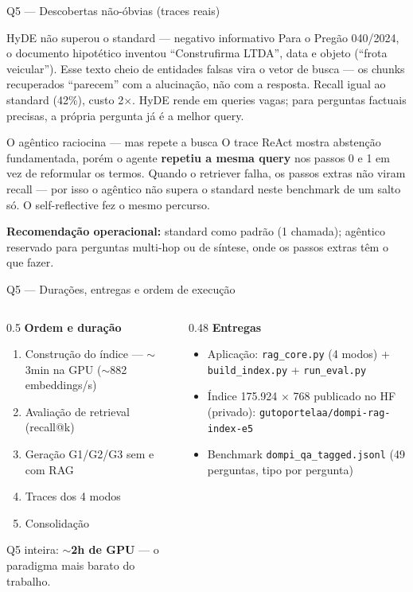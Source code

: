 \documentclass[10pt,aspectratio=169]{beamer}
\begin{document}
\begin{frame}{Q5 — Descobertas não-óbvias (traces reais)}
  \begin{alertblock}{HyDE não superou o standard — negativo informativo}
    \small Para o Pregão 040/2024, o documento hipotético inventou ``Construfirma LTDA'', data e
    objeto (``frota veicular''). Esse texto cheio de entidades falsas vira o vetor de busca — os
    chunks recuperados ``parecem'' com a alucinação, não com a resposta. Recall igual ao standard
    (42\%), custo 2$\times$. HyDE rende em queries vagas; para perguntas factuais precisas,
    a própria pergunta já é a melhor query.
  \end{alertblock}
  \begin{block}{O agêntico raciocina — mas repete a busca}
    \small O trace ReAct mostra abstenção fundamentada, porém o agente \textbf{repetiu a mesma query}
    nos passos 0 e 1 em vez de reformular os termos. Quando o retriever falha, os passos extras não
    viram recall — por isso o agêntico não supera o standard neste benchmark de um salto só.
    O self-reflective fez o mesmo percurso.
  \end{block}
  \small \textbf{Recomendação operacional:} standard como padrão (1 chamada); agêntico reservado
  para perguntas multi-hop ou de síntese, onde os passos extras têm o que fazer.
\end{frame}

\begin{frame}{Q5 — Durações, entregas e ordem de execução}
  \begin{columns}[T]
    \begin{column}{0.5\textwidth}
      \textbf{Ordem e duração}
      \begin{enumerate}\small
        \item Construção do índice — $\sim$3min na GPU ($\sim$882 embeddings/s)
        \item Avaliação de retrieval (recall@k)
        \item Geração G1/G2/G3 sem e com RAG
        \item Traces dos 4 modos
        \item Consolidação
      \end{enumerate}
      \small Q5 inteira: $\sim$\textbf{2h de GPU} — o paradigma mais barato do trabalho.
    \end{column}
    \begin{column}{0.48\textwidth}
      \textbf{Entregas}
      \begin{itemize}\small
        \item Aplicação: \texttt{rag\_core.py} (4 modos) + \texttt{build\_index.py} + \texttt{run\_eval.py}
        \item Índice 175.924 $\times$ 768 publicado no HF (privado): \texttt{gutoportelaa/dompi-rag-index-e5}
        \item Benchmark \texttt{dompi\_qa\_tagged.jsonl} (49 perguntas, tipo por pergunta)
      \end{itemize}
    \end{column}
  \end{columns}
\end{frame}
\end{document}
